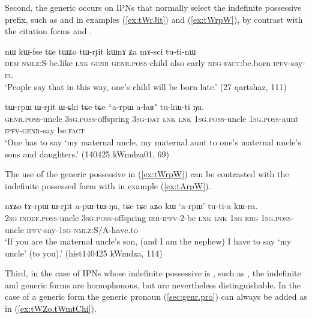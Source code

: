Second, the generic  occurs on IPNs that normally select the  indefinite possessive prefix, such as  and  in examples (\ref{ex:tWrJit}) and (\ref{ex:tWrpW}), by contrast with the citation forms   and .

\begin{exe}
\ex \label{ex:tWrJit}
\gll nɯ 	kɯ-fse 	tɕe 	tɯʑo 	tɯ-rɟit 	kɯnɤ 	ʑa 	mɤ-sci 	tu-ti-nɯ \\
\textsc{dem} \textsc{nmlz}:S-be.like \textsc{lnk} \textsc{genr} \textsc{genr.poss}-child also early \textsc{neg-fact}:be.born \textsc{ipfv}-say-\textsc{pl} \\
\glt `People say that in this way, one's child will be born late.' (27 qartshaz, 111)
\end{exe}

\begin{exe}
\ex \label{ex:tWrpW}
\gll  tɯ-rpɯ 	ɯ-rɟit 	ɯ-ɕki 	tɕe 	tɕe 	``a-rpɯ a-ɬaʁ" 	tu-kɯ-ti 	ŋu. \\
\textsc{genr.poss}-uncle \textsc{3sg.poss}-offspring \textsc{3sg-dat} \textsc{lnk} \textsc{lnk} \textsc{1sg.poss}-uncle \textsc{1sg.poss}-aunt \textsc{ipfv-genr}-say  be:\textsc{fact} \\
\glt `One has to say `my maternal uncle, my maternal aunt to one's maternal uncle's sons and daughters.' (140425 kWmdza01, 69)
\end{exe}

The use of the generic possessive  in (\ref{ex:tWrpW}) can be contrasted with the indefinite possessed form with  in example (\ref{ex:tArpW}).

\begin{exe}
\ex  \label{ex:tArpW}
\gll
nɤʑo 	tɤ-rpɯ 	ɯ-rɟit 	a-pɯ-tɯ-ŋu, 	tɕe 	tɕe 	aʑo 	kɯ 	`a-rpɯ' 	tu-ti-a 	kɯ-ra.  \\
\textsc{2sg} \textsc{indef.poss}-uncle \textsc{3sg.poss}-offspring \textsc{irr-ipfv}-2-be \textsc{lnk} \textsc{lnk} \textsc{1sg} \textsc{erg}  \textsc{1sg.poss}-uncle \textsc{ipfv}-say-\textsc{1sg} \textsc{nmlz:S/A}-have.to  \\
\glt `If you are the maternal uncle's son, (and I am the nephew) I have to say `my uncle' (to you).'  (hist140425 kWmdza, 114)
\end{exe}

Third, in the case of IPNs whose indefinite possessive is , such as , the indefinite and generic forms are homophonous, but are nevertheless distinguishable. In the case of a generic form the generic pronoun  (\ref{sec:genr.pro}) can always be added as in (\ref{ex:tWZo.tWmtChi}). 

